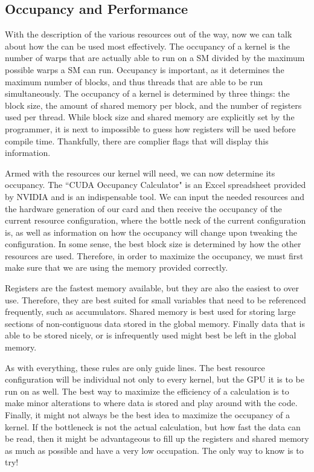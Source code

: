 \documentclass[12pt]{report}
\begin{document}
\subsection{Occupancy and Performance}
\label{sec:gpuocc}
With the description of the various resources out of the way, now we can talk about how the can be used most effectively. The occupancy of a kernel is the number of warps that are actually able to run on a SM divided by the maximum possible warps a SM can run. Occupancy is important, as it determines the maximum number of blocks, and thus threads that are able to be run simultaneously. The occupancy of a kernel is determined by three things: the block size, the amount of shared memory per block, and the number of registers used per thread. While block size and shared memory are explicitly set by the programmer, it is next to impossible to guess how registers will be used before compile time. Thankfully, there are complier flags that will display this information.

Armed with the resources our kernel will need, we can now determine its occupancy. The ``CUDA Occupancy Calculator" is an Excel spreadsheet provided by NVIDIA and is an indispensable tool. We can input the needed resources and the hardware generation of our card and then receive the occupancy of the current resource configuration, where the bottle neck of the current configuration is, as well as information on how the occupancy will change upon tweaking the configuration. In some sense, the best block size is determined by how the other resources are used. Therefore, in order to maximize the occupancy, we must first make sure that we are using the memory provided correctly.

Registers are the fastest memory available, but they are also the easiest to over use. Therefore, they are best suited for small variables that need to be referenced frequently, such as accumulators. Shared memory is best used for storing large sections of non-contiguous data stored in the global memory. Finally data that is able to be stored nicely, or is infrequently used might best be left in the global memory.

As with everything, these rules are only guide lines. The best resource configuration will be individual not only to every kernel, but the GPU it is to be run on as well. The best way to maximize the efficiency of a calculation is to make minor alterations to where data is stored and play around with the code. Finally, it might not always be the best idea to maximize the occupancy of a kernel. If the bottleneck is not the actual calculation, but how fast the data can be read, then it might be advantageous to fill up the registers and shared memory as much as possible and have a very low occupation. The only way to know is to try!
\end{document}

